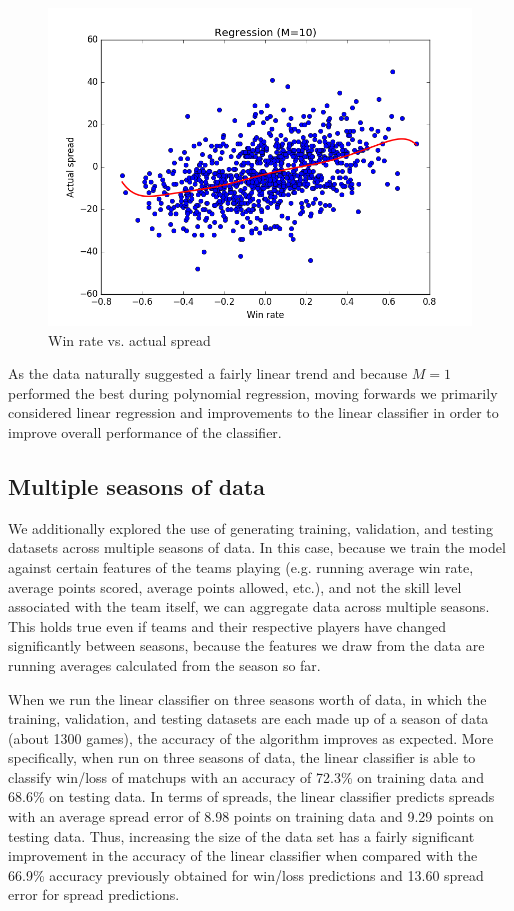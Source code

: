 \documentclass{article}
\begin{document}
\begin{figure}[width=\linewidth]
\begin{multicols}{2}
  \includegraphics[width=1.2\linewidth]{code/figures/linear_regression(m=10).png}
\end{multicols}
\caption{Win rate vs. actual spread}
\end{figure}

As the data naturally suggested a fairly linear trend and because $M=1$ performed the best during polynomial regression, moving forwards we primarily considered linear regression and improvements to the linear classifier in order to improve overall performance of the classifier.

\subsection{Multiple seasons of data}

We additionally explored the use of generating training, validation, and testing datasets across multiple seasons of data. In this case, because we train the model against certain features of the teams playing (e.g. running average win rate, average points scored, average points allowed, etc.), and not the skill level associated with the team itself, we can aggregate data across multiple seasons. This holds true even if teams and their respective players have changed significantly between seasons, because the features we draw from the data are running averages calculated from the season so far.

When we run the linear classifier on three seasons worth of data, in which the training, validation, and testing datasets are each made up of a season of data (about 1300 games), the accuracy of the algorithm improves as expected. More specifically, when run on three seasons of data, the linear classifier is able to classify win/loss of matchups with an accuracy of 72.3\% on training data and 68.6\% on testing data. In terms of spreads, the linear classifier predicts spreads with an average spread error of 8.98 points on training data and 9.29 points on testing data. Thus, increasing the size of the data set has a fairly significant improvement in the accuracy of the linear classifier when compared with the 66.9\% accuracy previously obtained for win/loss predictions and 13.60 spread error for spread predictions.
\end{document}
